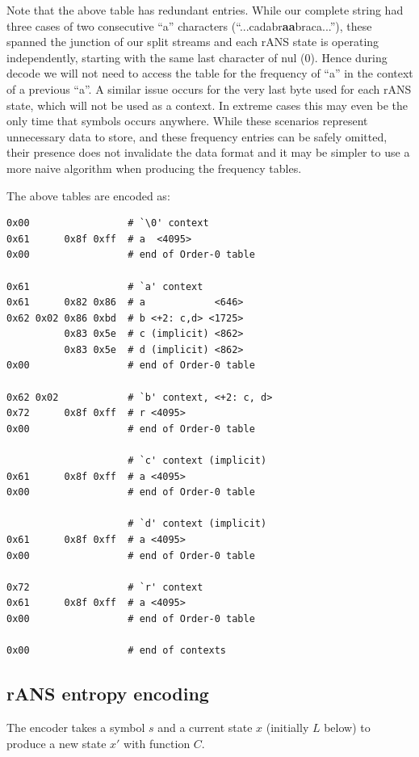 \documentclass[a4paper]{article}
\begin{document}
Note that the above table has redundant entries.  While our complete
string had three cases of two consecutive ``a'' characters
(``...cadabr\textbf{aa}braca...''), these spanned the junction of our
split streams and each rANS state is operating independently, starting
with the same last character of nul (0).  Hence during decode we will
not need to access the table for the frequency of ``a'' in the context
of a previous ``a''.  A similar issue occurs for the very last byte
used for each rANS state, which will not be used as a context.  In
extreme cases this may even be the only time that symbols occurs
anywhere.  While these scenarios represent unnecessary data to store,
and these frequency entries can be safely omitted, their presence does
not invalidate the data format and it may be simpler to use a more
naive algorithm when producing the frequency tables.


The above tables are encoded as:
\begin{verbatim}
0x00                 # `\0' context
0x61      0x8f 0xff  # a  <4095>
0x00                 # end of Order-0 table

0x61                 # `a' context
0x61      0x82 0x86  # a            <646>
0x62 0x02 0x86 0xbd  # b <+2: c,d> <1725>
          0x83 0x5e  # c (implicit) <862>
          0x83 0x5e  # d (implicit) <862>
0x00                 # end of Order-0 table

0x62 0x02            # `b' context, <+2: c, d>
0x72      0x8f 0xff  # r <4095>
0x00                 # end of Order-0 table

                     # `c' context (implicit)
0x61      0x8f 0xff  # a <4095>
0x00                 # end of Order-0 table

                     # `d' context (implicit)
0x61      0x8f 0xff  # a <4095>
0x00                 # end of Order-0 table

0x72                 # `r' context
0x61      0x8f 0xff  # a <4095>
0x00                 # end of Order-0 table

0x00                 # end of contexts
\end{verbatim}

\subsection{rANS entropy encoding}

The encoder takes a symbol $s$ and a current state $x$ (initially $L$ below) to
produce a new state $x'$ with function $C$.
\end{document}
